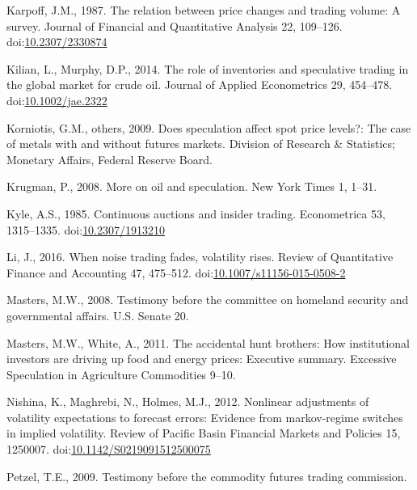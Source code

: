 \documentclass[]{elsarticle} %
\begin{document}
\leavevmode\hypertarget{ref-karpoff_relation_1987}{}%
Karpoff, J.M., 1987. The relation between price changes and trading
volume: A survey. Journal of Financial and Quantitative Analysis 22,
109--126. doi:\href{https://doi.org/10.2307/2330874}{10.2307/2330874}

\leavevmode\hypertarget{ref-kilian_role_2014}{}%
Kilian, L., Murphy, D.P., 2014. The role of inventories and speculative
trading in the global market for crude oil. Journal of Applied
Econometrics 29, 454--478.
doi:\href{https://doi.org/10.1002/jae.2322}{10.1002/jae.2322}

\leavevmode\hypertarget{ref-korniotis_does_2009}{}%
Korniotis, G.M., others, 2009. Does speculation affect spot price
levels?: The case of metals with and without futures markets. Division
of Research \& Statistics; Monetary Affairs, Federal Reserve Board.

\leavevmode\hypertarget{ref-krugman_more_2008}{}%
Krugman, P., 2008. More on oil and speculation. New York Times 1, 1--31.

\leavevmode\hypertarget{ref-kyle_continuous_1985}{}%
Kyle, A.S., 1985. Continuous auctions and insider trading. Econometrica
53, 1315--1335.
doi:\href{https://doi.org/10.2307/1913210}{10.2307/1913210}

\leavevmode\hypertarget{ref-li_when_2016}{}%
Li, J., 2016. When noise trading fades, volatility rises. Review of
Quantitative Finance and Accounting 47, 475--512.
doi:\href{https://doi.org/10.1007/s11156-015-0508-2}{10.1007/s11156-015-0508-2}

\leavevmode\hypertarget{ref-masters_testimony_2008}{}%
Masters, M.W., 2008. Testimony before the committee on homeland security
and governmental affairs. U.S. Senate 20.

\leavevmode\hypertarget{ref-masters_accidental_2011}{}%
Masters, M.W., White, A., 2011. The accidental hunt brothers: How
institutional investors are driving up food and energy prices: Executive
summary. Excessive Speculation in Agriculture Commodities 9--10.

\leavevmode\hypertarget{ref-nishina_nonlinear_2012}{}%
Nishina, K., Maghrebi, N., Holmes, M.J., 2012. Nonlinear adjustments of
volatility expectations to forecast errors: Evidence from markov-regime
switches in implied volatility. Review of Pacific Basin Financial
Markets and Policies 15, 1250007.
doi:\href{https://doi.org/10.1142/S0219091512500075}{10.1142/S0219091512500075}

\leavevmode\hypertarget{ref-petzel_testimony_2009}{}%
Petzel, T.E., 2009. Testimony before the commodity futures trading
commission.
\end{document}
